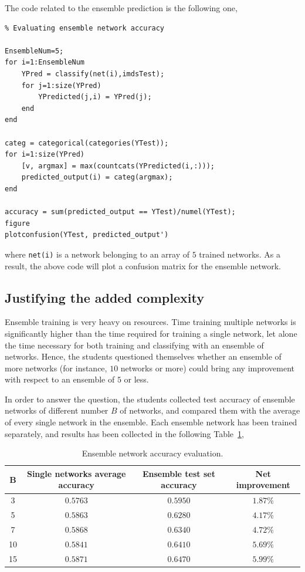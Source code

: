 \documentclass[a4paper, 11pt]{article} %
\begin{document}
The code related to the ensemble prediction is the following one,

\begin{lstlisting}
% Evaluating ensemble network accuracy

EnsembleNum=5;
for i=1:EnsembleNum
    YPred = classify(net(i),imdsTest);
    for j=1:size(YPred)
        YPredicted(j,i) = YPred(j);
    end
end    

categ = categorical(categories(YTest));
for i=1:size(YPred)
    [v, argmax] = max(countcats(YPredicted(i,:)));
    predicted_output(i) = categ(argmax);
end

accuracy = sum(predicted_output == YTest)/numel(YTest);
figure
plotconfusion(YTest, predicted_output')
\end{lstlisting}

where \texttt{net(i)} is a network belonging to an array of $5$ trained networks. As a result, the above code will plot a confusion matrix for the ensemble network.

\subsection{Justifying the added complexity}

Ensemble training is very heavy on resources. Time training multiple networks is significantly higher than the time required for training a single network, let alone the time necessary for both training and classifying with an ensemble of networks. Hence, the students questioned themselves whether an ensemble of more networks (for instance, $10$ networks or more) could bring any improvement with respect to an ensemble of $5$ or less.

In order to answer the question, the students collected test accuracy of ensemble networks of different number $B$ of networks, and compared them with the average of every single network in the ensemble. Each ensemble network has been trained separately, and results has been collected in the following Table~\ref{tab:ensemble-evaluation},

\begin{table}[ht]
\centering
\begin{tabular}{|c||c|c|c|}
\hline
\textbf{B} & \textbf{Single networks average accuracy} & \textbf{Ensemble test set accuracy} & \textbf{Net improvement}\\
\hline
\hline
3 & $0.5763$ & $0.5950$ & $1.87\%$ \\
\hline
5 & $0.5863$ & $0.6280$ & $4.17\%$ \\
\hline
7 & $0.5868$ & $0.6340$ & $4.72\%$\\
\hline
10 & $0.5841$ & $0.6410$ & $5.69\%$\\
\hline
15 & $0.5871$ & $0.6470$ & $5.99\%$\\
\hline
\end{tabular}
\caption{Ensemble network accuracy evaluation.}\label{tab:ensemble-evaluation}
\end{table}
\end{document}
